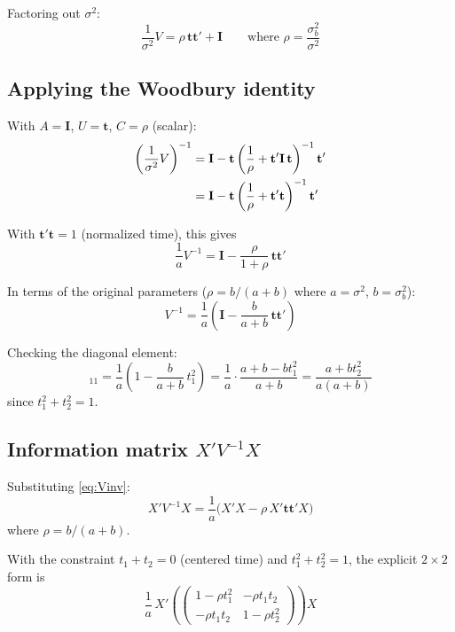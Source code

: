 \documentclass[11pt]{article}
\newcommand{\bI}{\mathbf{I}}
\newcommand{\bt}{\mathbf{t}}
\begin{document}
Factoring out $\sigma^2$:
\begin{equation}
  \frac{1}{\sigma^2} V
  = \rho\, \bt\bt' + \bI
  \qquad\text{where } \rho = \frac{\sigma_b^2}{\sigma^2}
\end{equation}


\subsection{Applying the Woodbury identity}

With $A = \bI$, $U = \bt$, $C = \rho$ (scalar):
\begin{align}
  \left(\frac{1}{\sigma^2}V\right)^{-1}
  &= \bI - \bt\left(\frac{1}{\rho}
    + \bt'\bI\,\bt\right)^{-1}\bt' \notag \\
  &= \bI - \bt\left(\frac{1}{\rho}
    + \bt'\bt\right)^{-1}\bt'
\end{align}

With $\bt'\bt = 1$ (normalized time), this gives
\begin{equation}
  \frac{1}{a}V^{-1}
  = \bI - \frac{\rho}{1+\rho}\,\bt\bt'
\end{equation}

In terms of the original parameters
($\rho = b/(a+b)$ where $a = \sigma^2$, $b = \sigma_b^2$):
\begin{equation}
  \boxed{
    V^{-1} = \frac{1}{a}\left(
      \bI - \frac{b}{a+b}\,\bt\bt'
    \right)
  }
  \label{eq:Vinv}
\end{equation}

Checking the diagonal element:
\begin{equation}
  [V^{-1}]_{11}
  = \frac{1}{a}\left(1 - \frac{b}{a+b}\,t_1^2\right)
  = \frac{1}{a}\cdot\frac{a + b - bt_1^2}{a+b}
  = \frac{a + bt_2^2}{a(a+b)}
\end{equation}
since $t_1^2 + t_2^2 = 1$.


\subsection{Information matrix $X'V^{-1}X$}

Substituting \eqref{eq:Vinv}:
\begin{equation}
  X'V^{-1}X
  = \frac{1}{a}\bigl(X'X - \rho\, X'\bt\bt'X\bigr)
  \label{eq:XVX}
\end{equation}
where $\rho = b/(a+b)$.

With the constraint $t_1 + t_2 = 0$ (centered time) and
$t_1^2 + t_2^2 = 1$, the explicit $2 \times 2$ form is
\begin{equation}
  \frac{1}{a}\, X'\!\left(
    \begin{pmatrix}
      1 - \rho t_1^2 & -\rho t_1 t_2 \\
      -\rho t_1 t_2  & 1 - \rho t_2^2
    \end{pmatrix}
  \right)\! X
\end{equation}
\end{document}
